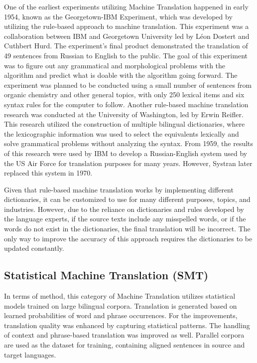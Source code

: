 \documentclass[sigconf]{acmart}
\begin{document}
        One of the earliest experiments utilizing Machine Translation happened in early 1954, known as the Georgetown-IBM Experiment, which was developed by utilizing the rule-based approach to machine translation. This experiment was a collaboration between IBM and Georgetown University led by Léon Dostert and Cuthbert Hurd. The experiment's final product demonstrated the translation of 49 sentences from Russian to English to the public\cite{Hutchins_2001}. The goal of this experiment was to figure out any grammatical and morphological problems with the algorithm and predict what is doable with the algorithm going forward. The experiment was planned to be conducted using a small number of sentences from organic chemistry and other general topics, with only 250 lexical items and six syntax rules for the computer to follow\cite{Hutchins_2004}. Another rule-based machine translation research was conducted at the University of Washington, led by Erwin Reifler. This research utilized the construction of multiple bilingual dictionaries, where the lexicographic information was used to select the equivalents lexically and solve grammatical problems without analyzing the syntax. From 1959, the results of this research were used by IBM to develop a Russian-English system used by the US Air Force for translation purposes for many years. However, Systran later replaced this system in 1970\cite{Hutchins_2001}.

        Given that rule-based machine translation works by implementing different dictionaries, it can be customized to use for many different purposes, topics, and industries. However, due to the reliance on dictionaries and rules developed by the language experts, if the source texts include any misspelled words, or if the words do not exist in the dictionaries, the final translation will be incorrect. The only way to improve the accuracy of this approach requires the dictionaries to be updated constantly\cite{Amazon_MT}.

    \subsection{Statistical Machine Translation (SMT)}
        In terms of method, this category of Machine Translation utilizes statistical models trained on large bilingual corpora. Translation is generated based on learned probabilities of word and phrase occurrences. For the improvements, translation quality was enhanced by capturing statistical patterns. The handling of context and phrase-based translation was improved as well. Parallel corpora are used as the dataset for training, containing aligned sentences in source and target languages.
\end{document}
